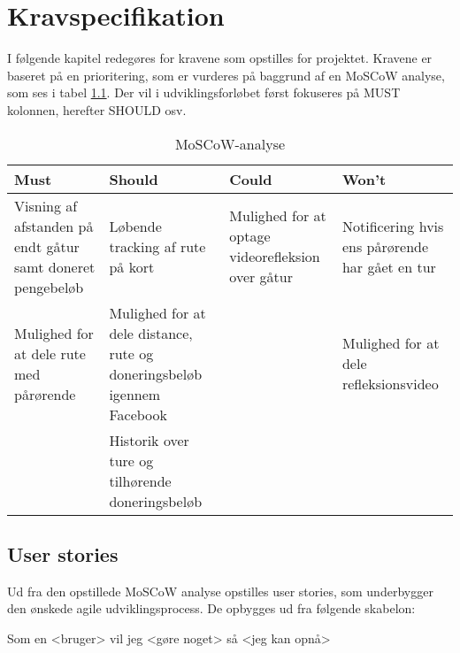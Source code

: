 \thispagestyle{fancy}
\chapter{Kravspecifikation}
\label{chp:kravspec}

I følgende kapitel redegøres for kravene som opstilles for projektet. Kravene er baseret på en prioritering, som er vurderes på baggrund af en MoSCoW analyse, som ses i tabel \ref{tab:MosCoW}. Der vil i udviklingsforløbet først fokuseres på MUST kolonnen, herefter SHOULD osv. 


\begin{table}[h]
\begin{tabular}{|>{\rr}p{3.2cm}|>{\rr}p{3.2cm}|>{\rr}p{3.2cm}|p{3.2cm}|} 
\hline
\rowcolor{ThemeColor!80}  
\rowcolor{ThemeColor!80} \vspace{0.2cm}  \textbf{Must} \newline & \vspace{0.2cm}  \textbf{Should} & \vspace{0.2cm}  \textbf{Could} &  \vspace{0.2cm} \textbf{Won't} \\ 
\hline
 Visning af afstanden på endt gåtur samt doneret pengebeløb   & Løbende tracking af rute på kort & Mulighed for at optage videorefleksion over gåtur & Notificering hvis ens pårørende har gået en tur \vspace{1cm} \\
\hline 
Mulighed for at dele rute med pårørende & Mulighed for at dele distance, rute og doneringsbeløb igennem Facebook &  & Mulighed for at dele refleksionsvideo  \vspace{1cm} \\
\hline
 & Historik over ture og tilhørende doneringsbeløb &  &  \\
\hline

\end{tabular}
\caption{MoSCoW-analyse}
\label{tab:MosCoW}
\end{table}
\FloatBarrier


\section{User stories}
Ud fra den opstillede MoSCoW analyse opstilles user stories, som underbygger den ønskede agile udviklingsprocess.
De opbygges ud fra følgende skabelon: \\

\centerline{Som en <bruger> vil jeg <gøre noget> så <jeg kan opnå>}  \hfill

